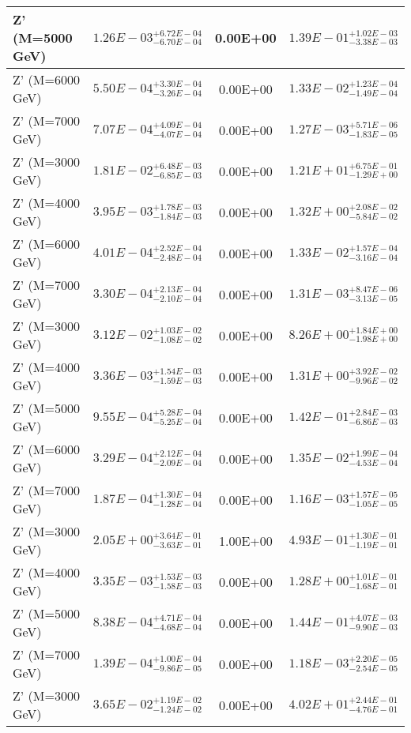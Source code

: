 \documentclass{article}
\begin{document}
\begin{center}
\begin{tabular}{ |l|c|c|c| }
 \hline
 Z' (M=5000 GeV) & $1.26E-03^{+6.72E-04}_{-6.70E-04}$ & 0.00E+00 & $1.39E-01^{+1.02E-03}_{-3.38E-03}$ \\
 \hline
 Z' (M=6000 GeV) & $5.50E-04^{+3.30E-04}_{-3.26E-04}$ & 0.00E+00 & $1.33E-02^{+1.23E-04}_{-1.49E-04}$ \\
 \hline
 Z' (M=7000 GeV) & $7.07E-04^{+4.09E-04}_{-4.07E-04}$ & 0.00E+00 & $1.27E-03^{+5.71E-06}_{-1.83E-05}$ \\
 \hline
 Z' (M=3000 GeV) & $1.81E-02^{+6.48E-03}_{-6.85E-03}$ & 0.00E+00 & $1.21E+01^{+6.75E-01}_{-1.29E+00}$ \\
 \hline
 Z' (M=4000 GeV) & $3.95E-03^{+1.78E-03}_{-1.84E-03}$ & 0.00E+00 & $1.32E+00^{+2.08E-02}_{-5.84E-02}$ \\
 \hline
 Z' (M=6000 GeV) & $4.01E-04^{+2.52E-04}_{-2.48E-04}$ & 0.00E+00 & $1.33E-02^{+1.57E-04}_{-3.16E-04}$ \\
 \hline
 Z' (M=7000 GeV) & $3.30E-04^{+2.13E-04}_{-2.10E-04}$ & 0.00E+00 & $1.31E-03^{+8.47E-06}_{-3.13E-05}$ \\
 \hline
 Z' (M=3000 GeV) & $3.12E-02^{+1.03E-02}_{-1.08E-02}$ & 0.00E+00 & $8.26E+00^{+1.84E+00}_{-1.98E+00}$ \\
 \hline
 Z' (M=4000 GeV) & $3.36E-03^{+1.54E-03}_{-1.59E-03}$ & 0.00E+00 & $1.31E+00^{+3.92E-02}_{-9.96E-02}$ \\
 \hline
 Z' (M=5000 GeV) & $9.55E-04^{+5.28E-04}_{-5.25E-04}$ & 0.00E+00 & $1.42E-01^{+2.84E-03}_{-6.86E-03}$ \\
 \hline
 Z' (M=6000 GeV) & $3.29E-04^{+2.12E-04}_{-2.09E-04}$ & 0.00E+00 & $1.35E-02^{+1.99E-04}_{-4.53E-04}$ \\
 \hline
 Z' (M=7000 GeV) & $1.87E-04^{+1.30E-04}_{-1.28E-04}$ & 0.00E+00 & $1.16E-03^{+1.57E-05}_{-1.05E-05}$ \\
 \hline
 Z' (M=3000 GeV) & $2.05E+00^{+3.64E-01}_{-3.63E-01}$ & 1.00E+00 & $4.93E-01^{+1.30E-01}_{-1.19E-01}$ \\
 \hline
 Z' (M=4000 GeV) & $3.35E-03^{+1.53E-03}_{-1.58E-03}$ & 0.00E+00 & $1.28E+00^{+1.01E-01}_{-1.68E-01}$ \\
 \hline
 Z' (M=5000 GeV) & $8.38E-04^{+4.71E-04}_{-4.68E-04}$ & 0.00E+00 & $1.44E-01^{+4.07E-03}_{-9.90E-03}$ \\
 \hline
 Z' (M=7000 GeV) & $1.39E-04^{+1.00E-04}_{-9.86E-05}$ & 0.00E+00 & $1.18E-03^{+2.20E-05}_{-2.54E-05}$ \\
 \hline
 Z' (M=3000 GeV) & $3.65E-02^{+1.19E-02}_{-1.24E-02}$ & 0.00E+00 & $4.02E+01^{+2.44E-01}_{-4.76E-01}$ \\

\end{tabular}
\end{center}
\end{document}
